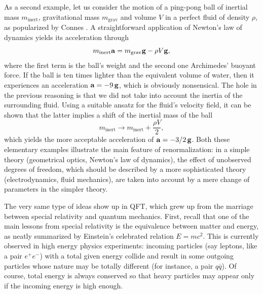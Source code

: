 \documentclass[12pt,here,feynmf]{article}
\begin{document}
As a second example, let us consider the motion of a ping-pong ball of inertial mass $m_{\mathrm{inert}}$, gravitational mass $m_{\mathrm{grav}}$ and volume $V$ in a perfect fluid of density $\rho$, as popularized by Connes \cite{connesmarcolli}. A straightforward application of Newton's law of dynamics yields its acceleration through 
\begin{equation} 
m_{\mathrm{inert}}{\bf a}=m_{\mathrm{grav}}{\bf g}-\rho V{\bf g},
\end{equation}
where the first term is the ball's weight and the second one Archimedes' buoyant force. If the ball is ten times lighter than the equivalent volume of water, then it experiences an acceleration ${\bf a}=-9\,{\bf g}$, which is obviously nonsensical. The hole in the previous reasoning is that we did not take into account the inertia of the surrounding fluid. Using a suitable ansatz for the fluid's velocity field, it can be shown \cite{connesmarcolli} that the latter implies a shift of the inertial mass of the ball 
\begin{equation}
m_{\mathrm{inert}}\rightarrow m_{\mathrm{inert}}+\frac{\rho V}{2},
\end{equation}
which yields the more acceptable acceleration of ${\bf a}=-3/2\,{\bf g}$.  Both these elementary examples illustrate the main feature of renormalization: in a simple theory (geometrical optics, Newton's law of dynamics), the effect of unobserved degrees of freedom, which should be described by a more sophisticated theory (electrodynamics, fluid mechanics), are taken into account by a mere change of parameters in the simpler theory.  

 
The very same type of ideas show up in QFT, which grew up from the marriage between special relativity and quantum mechanics. First, recall that one of the main lessons from special relativity is the equivalence between matter and energy, as neatly summarized by Einstein's celebrated relation $E=mc^{2}$. This is currently observed in high energy physics experiments: incoming particles (say leptons, like a pair $e^{+}e^{-}$) with a total given energy collide and result in some outgoing particles whose nature may be totally different (for instance, a pair $q\overline{q}$).  Of course, total energy is always conserved so that heavy particles may appear only if the incoming energy is high enough.
     
\end{document}
